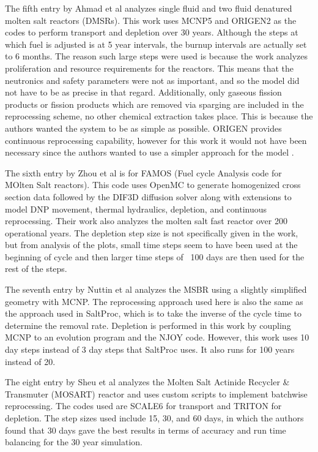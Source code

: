 The fifth entry by Ahmad et al analyzes single fluid and two fluid denatured molten salt reactors (DMSRs). This work uses MCNP5 and ORIGEN2 as the codes to perform transport and depletion over 30 years. Although the steps at which fuel is adjusted is at 5 year intervals, the burnup intervals are actually set to 6 months. The reason such large steps were used is because the work analyzes proliferation and resource requirements for the reactors. This means that the neutronics and safety parameters were not as important, and so the model did not have to be as precise in that regard. Additionally, only gaseous fission products or fission products which are removed via sparging are included in the reprocessing scheme, no other chemical extraction takes place. This is because the authors wanted the system to be as simple as possible. ORIGEN provides continuous reprocessing capability, however for this work it would not have been necessary since the authors wanted to use a simpler approach for the model \cite{gauld_isotopic_2011}.

The sixth entry by Zhou et al is for FAMOS (Fuel cycle Analysis code for MOlten Salt reactors). This code uses OpenMC to generate homogenized cross section data followed by the DIF3D diffusion solver along with extensions to model DNP movement, thermal hydraulics, depletion, and continuous reprocessing. Their work also analyzes the molten salt fast reactor over 200 operational years. The depletion step size is not specifically given in the work, but from analysis of the plots, small time steps seem to have been used at the beginning of cycle and then larger time steps of ~100 days are then used for the rest of the steps.

The seventh entry by Nuttin et al analyzes the MSBR using a slightly simplified geometry with MCNP. The reprocessing approach used here is also the same as the approach used in SaltProc, which is to take the inverse of the cycle time to determine the removal rate. Depletion is performed in this work by coupling MCNP to an evolution program and the NJOY code. However, this work uses 10 day steps instead of 3 day steps that SaltProc uses. It also runs for 100 years instead of 20.

The eight entry by Sheu et al analyzes the Molten Salt Actinide Recycler \& Transmuter (MOSART) reactor and uses custom scripts to implement batchwise reprocessing. The codes used are SCALE6 for transport and TRITON for depletion. The step sizes used include 15, 30, and 60 days, in which the authors found that 30 days gave the best results in terms of accuracy and run time balancing for the 30 year simulation.

